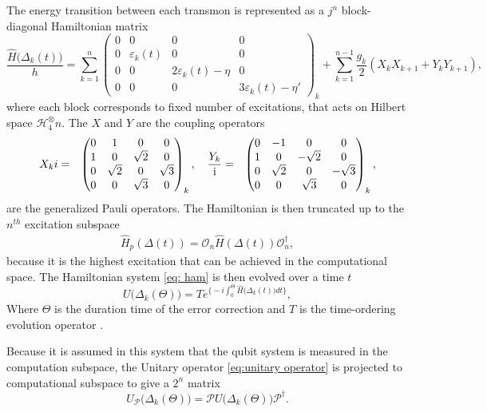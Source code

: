 The energy transition between each transmon is represented as a $j^n$ block-diagonal Hamiltonian matrix
\begin{equation}
  \label{eq:hamiltonian}
  \frac{\hat{H}\big(\Delta_k(t)\big)}{h} = \sum^n_{k=1} \begin{pmatrix} 0&0& 0&0\\0&\varepsilon_k(t)&0&0\\0&0&2\varepsilon_k(t)-\eta&0\\0&0&0&3\varepsilon_k(t)-\eta'\end{pmatrix}_{k}  + \sum^{n-1}_{k=1} \frac{g_k}{2}(X_kX_{k+1}+Y_{k}Y_{k+1}),  
\end{equation}
where each block corresponds to fixed number of excitations, that acts on Hilbert space $\mathscr{H}_4^{\otimes}n$. The $X$ and $Y$ are the coupling operators \cite{Ghosh2013}
\begin{align}
    \label{eq: coupling operators}
       X_ki &=& \begin{pmatrix} 0&1& 0&0\\1&0&\sqrt{2}&0\\0&\sqrt{2}&0&\sqrt{3}\\0&0&\sqrt{3}&0\end{pmatrix}_{k}, \quad
  \frac{Y_k}{\text i} &=&\begin{pmatrix} 0&-1& 0&0\\1&0&-\sqrt{2}&0\\0&\sqrt{2}&0&-\sqrt{3}\\0&0&\sqrt{3}&0\end{pmatrix}_{k}, 
\end{align}
are the generalized Pauli operators. The Hamiltonian is then truncated up to the $n^{th}$ excitation subspace
\begin{align}
  \label{eq: ham}
  \hat{H}_p(\Delta(t)) = \mathscr{O}_n \hat{H}(\Delta(t)) \mathscr{O}_n^{\dagger},
  \end{align}
  because it is the highest excitation that can be achieved in the computational space.
  The Hamiltonian system \eqref{eq: ham} is then evolved over a time $t$
\begin{equation}
  \label{eq:unitary operator}
  U\big( \Delta_k(\Theta) \big) = T e^{\Big\{ -i \int_{0}^{\Theta} \hat{H}\big( \Delta_k(t) \big) dt \Big\} }, 
\end{equation}
Where $\Theta$ is the duration time of the error correction and $T$ is the time-ordering evolution operator \cite{}. 

Because it is assumed in this system that the qubit system is measured in the computation subspace, the Unitary operator \eqref{eq:unitary operator} is projected to computational subspace to give a $2^n$ matrix
\begin{equation}
    \label{eq:projected}
    U_{\mathscr{P}} \big(\Delta_k (\Theta) \big) =  \mathscr{P} U \big(\Delta_k(\Theta) \big) \mathscr{P}^{\dagger}.
\end{equation}

